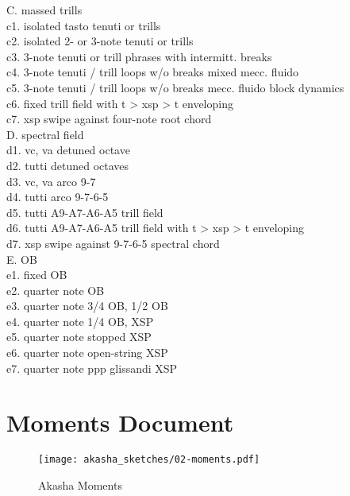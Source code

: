 C. massed trills\\
\quad  c1. isolated tasto tenuti or trills\\
\quad  c2. isolated 2- or 3-note tenuti or trills\\
\quad  c3. 3-note tenuti or trill phrases with intermitt. breaks\\
\quad  c4. 3-note tenuti / trill loops w/o breaks mixed mecc. fluido\\
\quad  c5. 3-note tenuti / trill loops w/o breaks mecc. fluido block dynamics\\
\quad  c6. fixed trill field with t > xsp > t enveloping \\
\quad  c7. xsp swipe against four-note root chord\\

D. spectral field\\
\quad  d1. vc, va detuned octave\\
\quad  d2. tutti detuned octaves\\
\quad  d3. vc, va arco 9-7\\
\quad  d4. tutti arco 9-7-6-5\\
\quad  d5. tutti A9-A7-A6-A5 trill field\\
\quad  d6. tutti A9-A7-A6-A5 trill field with t > xsp > t enveloping\\
\quad  d7. xsp swipe against 9-7-6-5 spectral chord\\

E. OB\\
\quad  e1. fixed OB\\
\quad  e2. quarter note OB\\
\quad  e3. quarter note 3/4 OB, 1/2 OB\\
\quad  e4. quarter note 1/4 OB, XSP\\
\quad  e5. quarter note stopped XSP\\
\quad  e6. quarter note open-string XSP\\
\quad  e7. quarter note ppp glissandi XSP\\

\section{Moments Document}

\begin{figure}[H] %
    \texttt{[image: akasha\_sketches/02-moments.pdf]}
    \caption{Akasha Moments}
    \label{fig:akashamomentsketch}
\end{figure}

